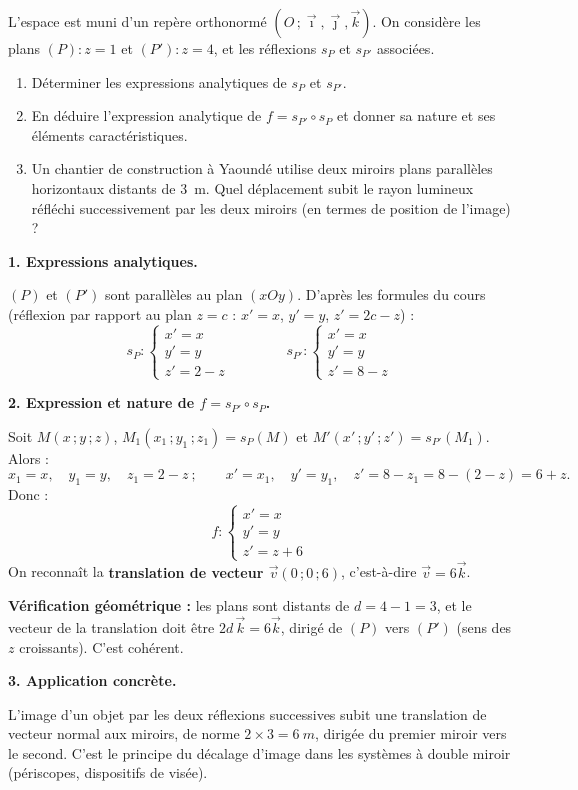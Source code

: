 \documentclass[11pt]{article}
\begin{document}
\begin{exoresolu}
L'espace est muni d'un repère orthonormé $(O\,;\vec{\imath},\vec{\jmath},\vec{k})$. On considère les plans $(P):z=1$ et $(P'):z=4$, et les réflexions $s_{P}$ et $s_{P'}$ associées.
\begin{enumerate}
\item Déterminer les expressions analytiques de $s_{P}$ et $s_{P'}$.
\item En déduire l'expression analytique de $f=s_{P'}\circ s_{P}$ et donner sa nature et ses éléments caractéristiques.
\item Un chantier de construction à Yaoundé utilise deux miroirs plans parallèles horizontaux distants de \SI{3}{m}. Quel déplacement subit le rayon lumineux réfléchi successivement par les deux miroirs (en termes de position de l'image) ?
\end{enumerate}
\tcblower
\textbf{1. Expressions analytiques.}

$(P)$ et $(P')$ sont parallèles au plan $(xOy)$. D'après les formules du cours (réflexion par rapport au plan $z=c$ : $x'=x$, $y'=y$, $z'=2c-z$) :
\[s_{P}:\begin{cases}x'=x\\ y'=y\\ z'=2-z\end{cases}\qquad\qquad s_{P'}:\begin{cases}x'=x\\ y'=y\\ z'=8-z\end{cases}\]

\textbf{2. Expression et nature de $f=s_{P'}\circ s_{P}$.}

Soit $M(x\,;y\,;z)$, $M_{1}(x_{1}\,;y_{1}\,;z_{1})=s_{P}(M)$ et $M'(x'\,;y'\,;z')=s_{P'}(M_{1})$. Alors :
\[x_{1}=x,\quad y_{1}=y,\quad z_{1}=2-z\ ;\qquad x'=x_{1},\quad y'=y_{1},\quad z'=8-z_{1}=8-(2-z)=6+z.\]
Donc :
\[f:\begin{cases}x'=x\\ y'=y\\ z'=z+6\end{cases}\]
On reconnaît la \textbf{translation de vecteur $\vec{v}(0\,;0\,;6)$}, c'est-à-dire $\vec{v}=6\vec{k}$.

\textbf{Vérification géométrique :} les plans sont distants de $d=4-1=3$, et le vecteur de la translation doit être $2d\,\vec{k}=6\vec{k}$, dirigé de $(P)$ vers $(P')$ (sens des $z$ croissants). C'est cohérent.

\textbf{3. Application concrète.}

L'image d'un objet par les deux réflexions successives subit une translation de vecteur normal aux miroirs, de norme $2\times 3=\SI{6}{m}$, dirigée du premier miroir vers le second. C'est le principe du décalage d'image dans les systèmes à double miroir (périscopes, dispositifs de visée).
\end{exoresolu}
\end{document}
